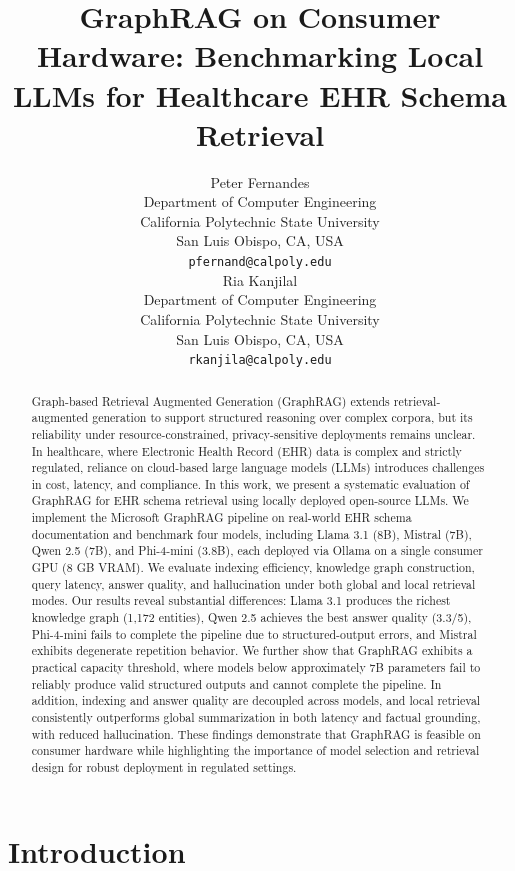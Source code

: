 \documentclass{article}
\title{GraphRAG on Consumer Hardware: Benchmarking Local LLMs for Healthcare EHR Schema Retrieval}
\author{%
  Peter Fernandes \\
  Department of Computer Engineering \\
  California Polytechnic State University \\
  San Luis Obispo, CA, USA \\
  \texttt{pfernand@calpoly.edu} \\
  \And
  Ria Kanjilal \\
  Department of Computer Engineering \\
  California Polytechnic State University \\
  San Luis Obispo, CA, USA \\
  \texttt{rkanjila@calpoly.edu} \\
}
\begin{document}
\maketitle

\begin{abstract}
Graph-based Retrieval Augmented Generation (GraphRAG) extends retrieval-augmented generation to support structured reasoning over complex corpora, but its reliability under resource-constrained, privacy-sensitive deployments remains unclear. In healthcare, where Electronic Health Record (EHR) data is complex and strictly regulated, reliance on cloud-based large language models (LLMs) introduces challenges in cost, latency, and compliance. In this work, we present a systematic evaluation of GraphRAG for EHR schema retrieval using locally deployed open-source LLMs. We implement the Microsoft GraphRAG pipeline on real-world EHR schema documentation and benchmark four models, including Llama 3.1 (8B), Mistral (7B), Qwen 2.5 (7B), and Phi-4-mini (3.8B), each deployed via Ollama on a single consumer GPU (8 GB VRAM). We evaluate indexing efficiency, knowledge graph construction, query latency, answer quality, and hallucination under both global and local retrieval modes. Our results reveal substantial differences: Llama 3.1 produces the richest knowledge graph (1,172 entities), Qwen 2.5 achieves the best answer quality (3.3/5), Phi-4-mini fails to complete the pipeline due to structured-output errors, and Mistral exhibits degenerate repetition behavior.  We further show that GraphRAG exhibits a practical capacity threshold, where models below approximately 7B parameters fail to reliably produce valid structured outputs and cannot complete the pipeline. In addition, indexing and answer quality are decoupled across models, and local retrieval consistently outperforms global summarization in both latency and factual grounding, with reduced hallucination. These findings demonstrate that GraphRAG is feasible on consumer hardware while highlighting the importance of model selection and retrieval design for robust deployment in regulated settings.
\end{abstract}

\section{Introduction}
\label{sec:intro}
\end{document}
